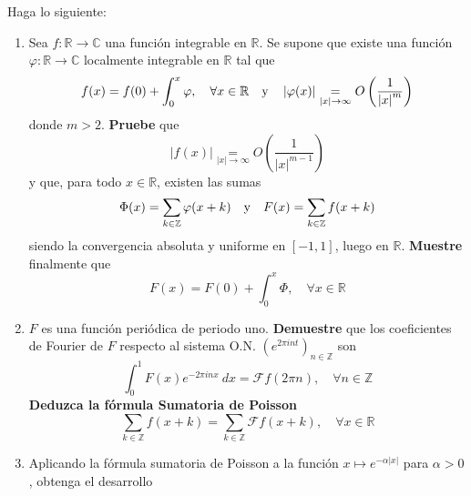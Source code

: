 \documentclass[12pt]{report}
\theoremstyle{largebreak}
\newcommand\abs[1]{\ensuremath{\left|#1\right|}}
\newcommand\cf[3]{\ensuremath{#1:#2\rightarrow#3}}
\newcommand{\fou}[1]{\ensuremath{\mathcal{F}#1}}
\begin{document}
    \begin{excer}
        Haga lo siguiente:
        \begin{enumerate}
            \item Sea $\cf{f}{\mathbb{R}}{\mathbb{C}}$ una función integrable en $\mathbb{R}$. Se supone que existe una función $\cf{\varphi}{\mathbb{R}}{\mathbb{C}}$ localmente integrable en $\mathbb{R}$ tal que
            \begin{equation*}
                f(x)=f(0)+\int_0^{x}\varphi,\quad\forall x\in\mathbb{R}\quad\textup{y}\quad\abs{\varphi(x)}\underset{\abs{x}\rightarrow\infty}{=}O\left(\frac{1}{\abs{x}^m}\right)
            \end{equation*}
            donde $m>2$. \textbf{Pruebe} que
            \begin{equation*}
                \abs{f(x)}\underset{\abs{x}\rightarrow\infty}{=}O\left(\frac{1}{\abs{x}^{ m-1}}\right)
            \end{equation*}
            y que, para todo $x\in\mathbb{R}$, existen las sumas
            \begin{equation*}
                \Phi(x)=\sum_{k\in\mathbb{Z}}\varphi(x+k)\quad\textup{y}\quad F(x)=\sum_{ k\in\mathbb{Z}}f(x+k)
            \end{equation*}
            siendo la convergencia absoluta y uniforme en $[-1,1]$, luego en $\mathbb{R}$. \textbf{Muestre} finalmente que
            \begin{equation*}
                F(x)=F(0)+\int_0^x\Phi,\quad\forall x\in\mathbb{R}
            \end{equation*}
            \item $F$ es una función periódica de periodo uno. \textbf{Demuestre} que los coeficientes de Fourier de $F$ respecto al sistema O.N. $\left(e^{2\pi int} \right)_{n\in\mathbb{Z}}$ son
            \begin{equation*}
                \int_0^1 F(x)e^{ -2\pi inx}\:dx=\fou{f}(2\pi n),\quad\forall n\in\mathbb{Z}
            \end{equation*}
            \textbf{Deduzca la fórmula Sumatoria de Poisson}
            \begin{equation*}
                \sum_{ k\in\mathbb{Z}}f(x+k)=\sum_{ k\in\mathbb{Z}}\fou{f}(x+k),\quad\forall x\in\mathbb{R}
            \end{equation*}
            \item Aplicando la fórmula sumatoria de Poisson a la función $x\mapsto e^{-\alpha\abs{x}}$ para $\alpha>0$, obtenga el desarrollo

\end{enumerate}
\end{excer}
\end{document}
